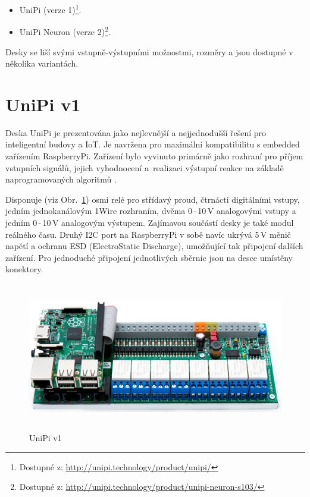 \begin{itemize}
	\item UniPi (verze 1)\footnote[1]{Dostupné z: \href{http://unipi.technology/product/unipi/}{http://unipi.technology/product/unipi/}}.
	\item UniPi Neuron (verze 2)\footnote[2]{Dostupné z: \href{http://unipi.technology/product/unipi-neuron-s103/}{http://unipi.technology/product/unipi-neuron-s103/}}.
\end{itemize}

\vspace{5mm}
Desky se liší svými vstupně-výstupními možnostmi, rozměry a jsou dostupné v několika variantách.




\section{UniPi v1}
\label{KapitolaUnipi1}

Deska UniPi je prezentována jako nejlevnější a nejjednodušší řešení pro inteligentní budovy a IoT. Je navržena pro maximální kompatibilitu s embedded zařízením RaspberryPi. Zařízení bylo vyvinuto primárně jako rozhraní pro příjem vstupních signálů, jejich vyhodnocení a~realizaci výstupní reakce na základě naprogramovaných algoritmů \cite{UniPiBoard1}.

Disponuje (viz Obr.~\ref{ObrazekUnipiV1}) osmi relé pro střídavý proud, čtrnácti digitálními vstupy, jedním jednokanálovým 1Wire rozhraním, dvěma 0\,-\,10\,V analogovými vstupy a jedním 0\,-\,10\,V analogovým výstupem. Zajímavou součástí desky je také modul reálného času. Druhý I2C port na RaspberryPi v sobě navíc ukrývá 5\,V měnič napětí a ochranu ESD (ElectroStatic Discharge), umožňující tak připojení dalších zařízení. Pro jednoduché připojení jednotlivých sběrnic jsou na desce umístěny konektory.

 \begin{figure}[!ht]
  \begin{center}
    \includegraphics[height=6.5cm]{obrazky/unipi_v1}
  \end{center}
	\vspace{-20pt}
  \caption{UniPi v1 \cite{UniPiBoard1}}
	\label{ObrazekUnipiV1}
	\vspace{-30pt}
\end{figure}

